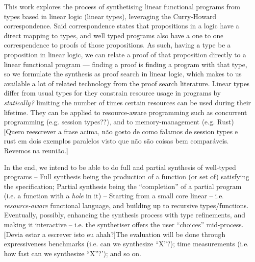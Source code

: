 \documentclass{llncs}
\begin{document}
This work explores the process of synthetising linear functional
programs from types based in linear logic (linear types), leveraging
the Curry-Howard correspondence.  Said correspondence states that
propositions in a logic have a direct mapping to types, and well typed
programs also have a one to one correspendence to proofs of those
propositions.  As such, having a type be a proposition in linear
logic, we can relate a proof of that proposition directly to a linear
functional program — finding a proof is finding a program with that
type, so we formulate the synthesis as proof search in linear logic,
which makes to us available a lot of related technology from the proof
search literature.  Linear types differ from usual types for they
constrain resource usage in programs by \emph{statically?} limiting
the number of times certain resources can be used during their
lifetime.  They can be applied to resource-aware programming such as
concurrent programming (e.g. session types??), and to
memory-management (e.g. Rust) [Quero reescrever a frase acima, não
gosto de como falamos de session types e rust em dois exemplos
paralelos visto que não são coisas bem comparáveis. Revemos na
reunião.]
 
In the end, we intend to be able to do full and partial synthesis of
well-typed programs -- Full synthesis being the production of a
function (or set of) satisfying the specification; Partial synthesis
being the ``completion'' of a partial program (i.e. a function with a
\emph{hole} in it) -- Starting from a small core linear --
i.e. \emph{resource-aware} functional language, and building up to
recursive types/functions.  Eventually, possibly, enhancing the
synthesis process with type refinements, and making it interactive --
i.e. the synthetiser offers the user ``choices'' mid-process.  [Devia
estar a escrever isto eu ahah?]The evaluation will be done through
expressiveness benchmarks (i.e. can we synthesize ``X''?); time
measurements (i.e. how fast can we synthesize ``X''?'); and so on.
\end{document}
